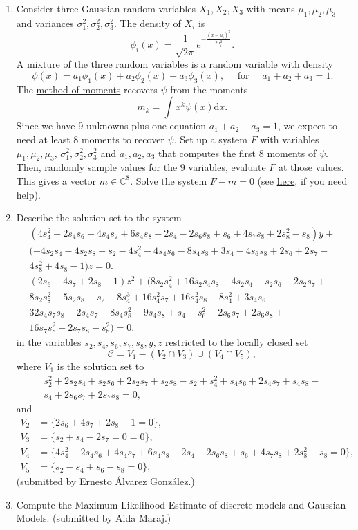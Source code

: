 \documentclass[11pt,reqno]{amsart}
\theoremstyle{definition}
\theoremstyle{remark}
\numberwithin{equation}{section}
\begin{document}
\begin{enumerate}
\item Consider three Gaussian random variables $X_1,X_2,X_3$ with means $\mu_1,\mu_2,\mu_3$ and variances $\sigma_1^2,\sigma_2^2,\sigma_3^2$. The density of $X_i$ is
$$\phi_i(x) = \frac{1}{\sqrt{2\pi}} e^{-\frac{(x-\mu_i)^2}{2\sigma_i^2}}.$$
A mixture of the three random variables is a random variable with density
$$\psi(x) = a_1 \phi_1(x) + a_2 \phi_2(x) + a_3 \phi_3(x), \quad\text{   for } \quad  a_1+a_2+a_3 =1.$$
The \href{https://en.wikipedia.org/wiki/Method_of_moments_(statistics)}{method of moments} recovers $\psi$ from the moments
  $$m_k = \int x^k \psi(x) \mathrm{d}x.$$
Since we have 9 unknowns plus one equation $a_1+a_2+a_3=1$, we expect to need at least 8 moments to recover $\psi$. Set up a system $F$ with variables $\mu_1,\mu_2,\mu_3$, $\sigma_1^2,\sigma_2^2,\sigma_3^2$ and $a_1,a_2,a_3$ that computes the first 8 moments of $\psi$. Then, randomly sample values for the 9 variables, evaluate $F$ at those values. This gives a vector $m\in \mathbb C^8$. Solve the system $F-m=0$ (see \href{https://www.juliahomotopycontinuation.org/examples/method-of-moments/}{here}, if you need help).

\item Describe the solution set to the system
\begin{align*}
(4s_4^2-2s_4s_6+4s_4s_7+6s_4s_8-2s_4-2s_6s_8+s_6+4s_7s_8+2s_8^2-s_8)y+\\
(-4s_2s_4-4s_2s_8+s_2-4s_4^2-4s_4s_6-8s_4s_8+3s_4-4s_6s_8+2s_6+2s_7- \\
4s_8^2+4s_8-1)z = 0.\\
(2s_6+4s_7+2s_8-1)z^2+(8s_2s_4^2+16s_2s_4s_8-4s_2s_4-s_2s_6-2s_2s_7+ \\
8s_2s_8^2-5s_2s_8+s_2+8s_4^3+16s_4^2s_7+16s_4^2s_8-8s_4^2+3s_4s_6+ \\
32s_4s_7s_8-2s_4s_7+8s_4s_8^2-9s_4s_8+s_4-s_6^2-2s_6s_7+2s_6s_8+\\
16s_7s_8^2-2s_7s_8-s_8^2) = 0.
\end{align*}
in the variables $s_2,s_4,s_6,s_7,s_8, y,z$ restricted to the locally closed set
$$\mathcal{C} = {V}_1-({V}_2\cap{V}_3)\cup({V}_4\cap{V}_5),$$
where ${V}_1$ is the solution set to
\begin{align*}
s_2^2+2s_2s_4+s_2s_6+2s_2s_7+s_2s_8-s_2+s_4^2+s_4s_6+2s_4s_7+s_4s_8-\\
s_4+2s_6s_7+2s_7s_8 = 0,
\end{align*}
and
\begin{align*}
{V}_2  &= \{2s_6+4s_7+2s_8-1 = 0\},\\
{V}_3  &= \{s_2+s_4-2s_7 = 0 = 0\},\\
{V}_4  &= \{4s_4^2-2s_4s_6+4s_4s_7+6s_4s_8-2s_4-2s_6s_8+s_6+4s_7s_8+2s_8^2-s_8  = 0\},\\
{V}_5  &= \{s_2-s_4+s_6-s_8 = 0\},
\end{align*}
(submitted by Ernesto \'{A}lvarez Gonz\'{a}lez.)

\item Compute the Maximum Likelihood Estimate of discrete models and Gaussian Models. (submitted by Aida Maraj.)
\end{enumerate}
\end{document}

